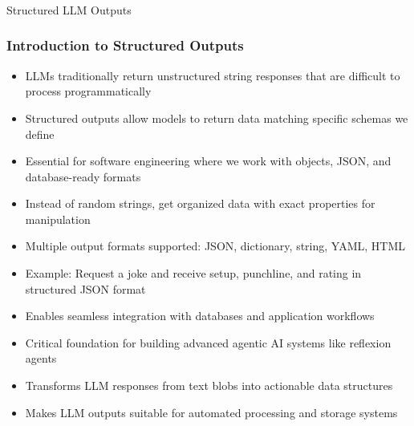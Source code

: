 \begin{frame}[fragile]\frametitle{}
\begin{center}
{\Large Structured LLM Outputs}
\end{center}
\end{frame}

\begin{frame}[fragile]\frametitle{Introduction to Structured Outputs}
      \begin{itemize}
	\item LLMs traditionally return unstructured string responses that are difficult to process programmatically
	\item Structured outputs allow models to return data matching specific schemas we define
	\item Essential for software engineering where we work with objects, JSON, and database-ready formats
	\item Instead of random strings, get organized data with exact properties for manipulation
	\item Multiple output formats supported: JSON, dictionary, string, YAML, HTML
	\item Example: Request a joke and receive setup, punchline, and rating in structured JSON format
	\item Enables seamless integration with databases and application workflows
	\item Critical foundation for building advanced agentic AI systems like reflexion agents
	\item Transforms LLM responses from text blobs into actionable data structures
	\item Makes LLM outputs suitable for automated processing and storage systems
	  \end{itemize}
\end{frame}

